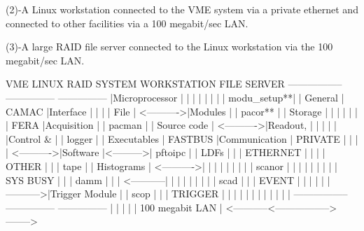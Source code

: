    (2)-A  Linux workstation connected to the VME system via a private ethernet
       and connected to other facilities via a 100 megabit/sec LAN.
 
   (3)-A large RAID file server connected to the  Linux  workstation  via  the
       100 megabit/sec LAN.
 
 
 
                VME                         LINUX              RAID
                SYSTEM                      WORKSTATION        FILE SERVER
               -----------------           ---------------    ---------------
               |Microprocessor |           |             |    |             |
               |               |           | modu_setup**|    | General     |
     CAMAC     |Interface      |           |             |    | File        |
   <---------->|Modules        |           | pacor**     |    | Storage     |
               |               |           |             |    |             |
     FERA      |Acquisition    |           | pacman      |    | Source code |
   <---------->|Readout,       |           |             |    |             |
               |Control &      |           | logger      |    | Executables |
     FASTBUS   |Communication  |  PRIVATE  |             |    |             |
   <---------->|Software       |<--------->| pftoipc     |    | LDFs        |
               |               |  ETHERNET |             |    |             |
     OTHER     |               |           | tape        |    | Histograms  |
   <---------->|               |           |             |    |             |
               |               |           | scanor      |    |             |
               |               |           |             |    |             |
     SYS BUSY  |               |           | damm        |    |             |
   <-----------|               |           |             |    |             |
               |               |           | scad        |    |             |
     EVENT     |               |           |             |    |             |
   ----------->|Trigger Module |           | scop        |    |             |
     TRIGGER   |               |           |             |    |             |
               |               |           |             |    |             |
               -----------------           ---------------    ---------------
                                                 |                   |
                                                 |                   |
                                                 |  100 megabit LAN  |
                                      <-----------<----------------->-------->
 
